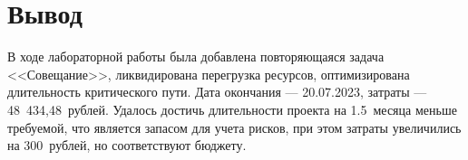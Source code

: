 \section{Вывод}

В ходе лабораторной работы была добавлена повторяющаяся задача <<Совещание>>,
ликвидирована перегрузка ресурсов, оптимизирована длительность критического
пути. Дата окончания --- 20.07.2023, затраты --- 48~434,48~рублей. Удалось
достичь длительности проекта на 1.5~месяца меньше требуемой, что является
запасом для учета рисков, при этом затраты увеличились на 300~рублей, но
соответствуют бюджету.

